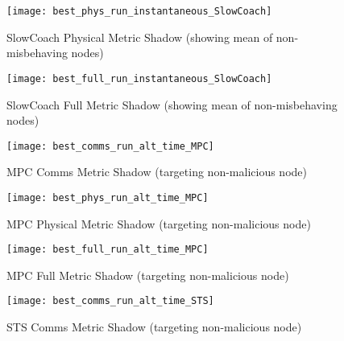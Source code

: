 \documentclass[aspectratio=169]{beamer}
\begin{document}
\begin{frame}\begin{figure}[h]
	\centering
	\texttt{[image: best\_phys\_run\_instantaneous\_SlowCoach]}
	\caption{SlowCoach Physical Metric Shadow (showing mean of non-misbehaving nodes)}
	\label{fig:phys_instantaneous_slowcoach}
\end{figure}\end{frame}

\begin{frame}\begin{figure}[h]
	\centering
	\texttt{[image: best\_full\_run\_instantaneous\_SlowCoach]}
	\caption{SlowCoach Full Metric Shadow (showing mean of non-misbehaving nodes)}
	\label{fig:full_instantaneous_slowcoach}
\end{figure}\end{frame}


\begin{frame}\begin{figure}[h]
	\centering
	\texttt{[image: best\_comms\_run\_alt\_time\_MPC]}
	\caption{MPC Comms Metric Shadow (targeting non-malicious node)}
	\label{fig:comms_alt_time_mpc}
\end{figure}\end{frame}

\begin{frame}\begin{figure}[h]
	\centering
	\texttt{[image: best\_phys\_run\_alt\_time\_MPC]}
	\caption{MPC Physical Metric Shadow (targeting non-malicious node)}
	\label{fig:phys_alt_time_mpc}
\end{figure}\end{frame}

\begin{frame}\begin{figure}[h]
	\centering
	\texttt{[image: best\_full\_run\_alt\_time\_MPC]}
	\caption{MPC Full Metric Shadow (targeting non-malicious node)}
	\label{fig:full_alt_time_mpc}
\end{figure}\end{frame}


\begin{frame}\begin{figure}[h]
	\centering
	\texttt{[image: best\_comms\_run\_alt\_time\_STS]}
	\caption{STS Comms Metric Shadow (targeting non-malicious node)}
	\label{fig:comms_alt_time_sts}
\end{figure}\end{frame}
\end{document}
